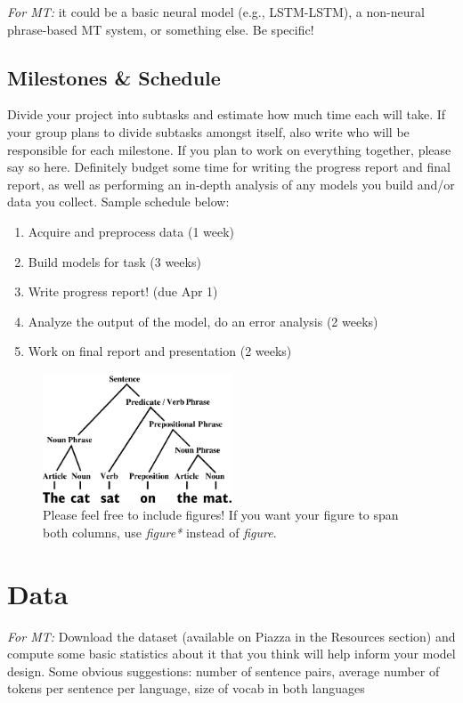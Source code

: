 \documentclass[11pt,a4paper]{article}
\begin{document}
\noindent\textit{For MT:} it could be a basic neural model (e.g., LSTM-LSTM), a non-neural phrase-based MT system, or something else. Be specific! 

\subsection{Milestones \& Schedule}
Divide your project into subtasks and estimate how much time each will take. If your group plans to divide subtasks amongst itself, also write who will be responsible for each milestone. If you plan to work on everything together, please say so here. Definitely budget some time for writing the progress report and final report, as well as performing an in-depth analysis of any models you build and/or data you collect. Sample schedule below:
\begin{enumerate}
    \item Acquire and preprocess data (1 week)
    \item Build models for task (3 weeks)
    \item Write progress report! (due Apr 1)
    \item Analyze the output of the model, do an error analysis (2 weeks)
    \item Work on final report and presentation (2 weeks)
\end{enumerate}

\begin{figure}[t]
    \centering
    \includegraphics[width=0.5\textwidth]{figs/sentence.png}
    \caption{Please feel free to include figures! If you want your figure to span both columns, use \emph{figure*} instead of \emph{figure}.}
    \label{fig:example}
\end{figure}

\section{Data}

\textit{For MT:}
Download the dataset (available on Piazza in the Resources section) and compute some basic statistics about it that you think will help inform your model design. Some obvious suggestions: number of sentence pairs, average number of tokens per sentence per language, size of vocab in both languages 
\end{document}
